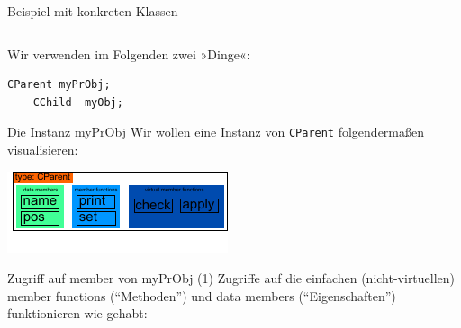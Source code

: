 \begin{frame}[fragile]{Beispiel mit konkreten Klassen}
	\footnotesize
	\begin{columns}
		
		
		
	\end{columns}
	
	\pause
	\vspace{1em}
	
	Wir verwenden im Folgenden zwei »Dinge«:
	\begin{lstlisting}[lanuage=C++]
	CParent myPrObj;
	CChild  myObj;
	\end{lstlisting}
\end{frame}

\begin{frame}[fragile,b]{Die Instanz myPrObj}
	Wir wollen eine Instanz von \verb|CParent| folgendermaßen visualisieren:
	
	\vspace{2em}
	
	\includegraphics[width=0.5\linewidth]{images/myPrObj}
\end{frame}

\begin{frame}[fragile,b]{Zugriff auf member von myPrObj (1)}
	Zugriffe auf die einfachen (nicht-virtuellen) member functions (\enquote{Methoden}) und data members (\enquote{Eigenschaften}) funktionieren wie gehabt:
	
	\vspace{2em}
	
\end{frame}

